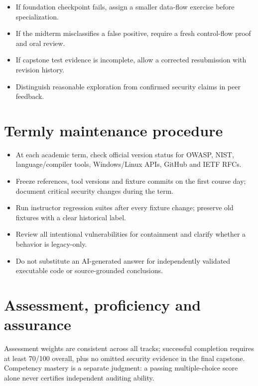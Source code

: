 \documentclass[10pt,letterpaper]{article}
\begin{document}
\begin{itemize}[leftmargin=*,itemsep=2pt]
\item If foundation checkpoint fails, assign a smaller data-flow exercise before specialization.
\item If the midterm misclassifies a false positive, require a fresh control-flow proof and oral review.
\item If capstone test evidence is incomplete, allow a corrected resubmission with revision history.
\item Distinguish reasonable exploration from confirmed security claims in peer feedback.
\end{itemize}
\section{Termly maintenance procedure}
\begin{itemize}[leftmargin=*,itemsep=2pt]
\item At each academic term, check official version status for OWASP, NIST, language/compiler tools, Windows/Linux APIs, GitHub and IETF RFCs.
\item Freeze references, tool versions and fixture commits on the first course day; document critical security changes during the term.
\item Run instructor regression suites after every fixture change; preserve old fixtures with a clear historical label.
\item Review all intentional vulnerabilities for containment and clarify whether a behavior is legacy-only.
\item Do not substitute an AI-generated answer for independently validated executable code or source-grounded conclusions.
\end{itemize}
\section{Assessment, proficiency and assurance}
Assessment weights are consistent across all tracks; successful completion requires at least 70/100 overall, plus no omitted security evidence in the final capstone. Competency mastery is a separate judgment: a passing multiple-choice score alone never certifies independent auditing ability.
\end{document}
